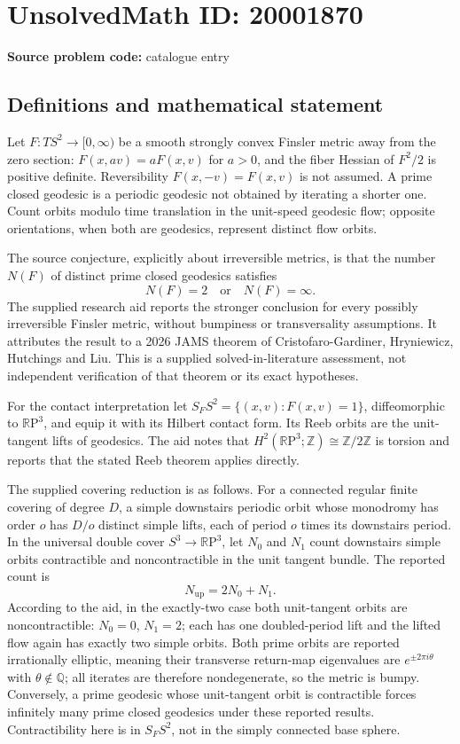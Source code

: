 \documentclass[11pt]{article}
\newcommand{\Z}{\mathbb{Z}}
\newcommand{\Q}{\mathbb{Q}}
\newcommand{\R}{\mathbb{R}}
\begin{document}
\section*{UnsolvedMath ID: 20001870}
\textbf{Source problem code:} catalogue entry
\subsection{Definitions and mathematical statement}
Let \(F:TS^2\to[0,\infty)\) be a smooth strongly convex Finsler metric away from the zero section: \(F(x,av)=aF(x,v)\) for \(a>0\), and the fiber Hessian of \(F^2/2\) is positive definite. Reversibility \(F(x,-v)=F(x,v)\) is not assumed. A prime closed geodesic is a periodic geodesic not obtained by iterating a shorter one. Count orbits modulo time translation in the unit-speed geodesic flow; opposite orientations, when both are geodesics, represent distinct flow orbits.

The source conjecture, explicitly about irreversible metrics, is that the number \(N(F)\) of distinct prime closed geodesics satisfies
\[
N(F)=2\quad\text{or}\quad N(F)=\infty.
\]
The supplied research aid reports the stronger conclusion for every possibly irreversible Finsler metric, without bumpiness or transversality assumptions. It attributes the result to a 2026 JAMS theorem of Cristofaro-Gardiner, Hryniewicz, Hutchings and Liu. This is a supplied solved-in-literature assessment, not independent verification of that theorem or its exact hypotheses.

For the contact interpretation let \(S_FS^2=\{(x,v):F(x,v)=1\}\), diffeomorphic to \(\R\mathrm P^3\), and equip it with its Hilbert contact form. Its Reeb orbits are the unit-tangent lifts of geodesics. The aid notes that \(H^2(\R\mathrm P^3;\Z)\cong\Z/2\Z\) is torsion and reports that the stated Reeb theorem applies directly.

The supplied covering reduction is as follows. For a connected regular finite covering of degree \(D\), a simple downstairs periodic orbit whose monodromy has order \(o\) has \(D/o\) distinct simple lifts, each of period \(o\) times its downstairs period. In the universal double cover \(S^3\to\R\mathrm P^3\), let \(N_0\) and \(N_1\) count downstairs simple orbits contractible and noncontractible in the unit tangent bundle. The reported count is
\[
N_{\mathrm{up}}=2N_0+N_1.
\]
According to the aid, in the exactly-two case both unit-tangent orbits are noncontractible: \(N_0=0\), \(N_1=2\); each has one doubled-period lift and the lifted flow again has exactly two simple orbits. Both prime orbits are reported irrationally elliptic, meaning their transverse return-map eigenvalues are \(e^{\pm2\pi i\theta}\) with \(\theta\notin\Q\); all iterates are therefore nondegenerate, so the metric is bumpy. Conversely, a prime geodesic whose unit-tangent orbit is contractible forces infinitely many prime closed geodesics under these reported results. Contractibility here is in \(S_FS^2\), not in the simply connected base sphere.
\end{document}
